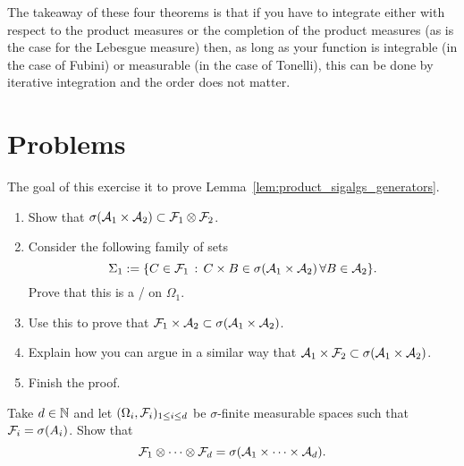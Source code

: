 The takeaway of these four theorems is that if you have to integrate either with respect to the product measures or the completion of the product measures (as is the case for the Lebesgue measure) then, as long as your function is integrable (in the case of Fubini) or measurable (in the case of Tonelli), this can be done by iterative integration and the order does not matter.


\section{Problems}

\begin{problem}\label{prb:product_sigalgs_generators}
The goal of this exercise it to prove Lemma~\ref{lem:product_sigalgs_generators}.
\begin{enumerate}[label={(\alph*)}]
\item Show that $\sigma(\mathcal A_1 \times \mathcal A_2) \subset \mathcal F_1 \otimes \mathcal F_2$.
\item Consider the following family of sets
\[
	\Sigma_1 := \{C \in \mathcal F_1 \, : \, C \times B \in \sigma(\mathcal A_1 \times \mathcal A_2) \, \forall B \in \mathcal A_2\}.
\]
Prove that this is a \sigalg/ on $\Omega_1$.
\item Use this to prove that $\mathcal F_1 \times \mathcal A_2 \subset \sigma(\mathcal A_1 \times \mathcal A_2)$.
\item Explain how you can argue in a similar way that $\mathcal A_1 \times \mathcal F_2 \subset \sigma(\mathcal A_1 \times \mathcal A_2)$.
\item Finish the proof.
\end{enumerate}
\end{problem}

\begin{problem}
Take $d \in \mathbb N$ and let $(\Omega_i, \mathcal F_i)_{1 \le i \le d}$ be $\sigma$-finite measurable spaces such that $\mathcal F_i = \sigma(A_i)$. Show that
\[
	\mathcal F_1 \otimes \dots \otimes \mathcal F_d = \sigma(\mathcal A_1 \times \dots \times \mathcal A_d).
\]
\end{problem}

